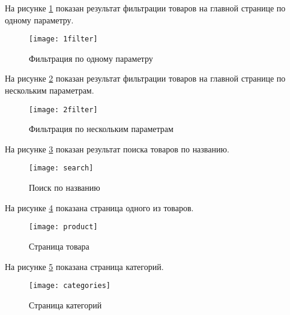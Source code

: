 На рисунке \ref{1filter:image} показан результат фильтрации товаров на главной странице по одному параметру.

\begin{figure}[H]
	\texttt{[image: 1filter]}
	\caption{Фильтрация по одному параметру}
	\label{1filter:image}
\end{figure}

На рисунке \ref{2filter:image} показан результат фильтрации товаров на главной странице по нескольким параметрам.

\begin{figure}[H]
	\texttt{[image: 2filter]}
	\caption{Фильтрация по нескольким параметрам}
	\label{2filter:image}
\end{figure}

На рисунке \ref{search:image} показан результат поиска товаров по названию.

\begin{figure}[H]
	\texttt{[image: search]}
	\caption{Поиск по названию}
	\label{search:image}
\end{figure}

На рисунке \ref{product:image} показана страница одного из товаров.

\begin{figure}[H]
	\texttt{[image: product]}
	\caption{Страница товара}
	\label{product:image}
\end{figure}


На рисунке \ref{categories:image} показана страница категорий.

\begin{figure}[H]
	\texttt{[image: categories]}
	\caption{Страница категорий}
	\label{categories:image}
\end{figure}


